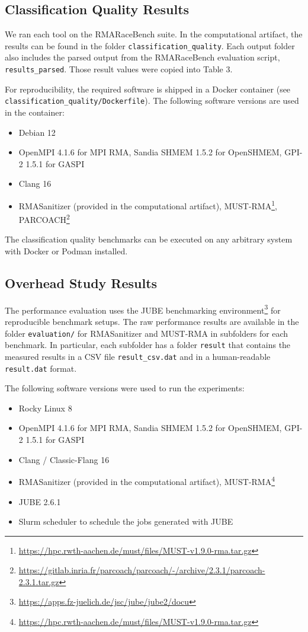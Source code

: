 \documentclass[twoside]{article}
\begin{document}
\subsection*{Classification Quality Results}
We ran each tool on the RMARaceBench suite. 
In the computational artifact, the results can be found in the folder \texttt{classification\_quality}.
Each output folder also includes the parsed output from the RMARaceBench evaluation script, \texttt{results\_parsed}.
Those result values were copied into Table 3.

For reproducibility, the required software is shipped in a Docker container (see \texttt{classification\_quality/Dockerfile}). The following software versions are used in the container:
\begin{itemize}
\item Debian 12
\item OpenMPI 4.1.6 for MPI RMA, Sandia SHMEM 1.5.2 for OpenSHMEM, GPI-2 1.5.1 for GASPI
\item Clang 16
\item RMASanitizer (provided in the computational artifact), MUST-RMA\footnote{\url{https://hpc.rwth-aachen.de/must/files/MUST-v1.9.0-rma.tar.gz}}, PARCOACH\footnote{\url{https://gitlab.inria.fr/parcoach/parcoach/-/archive/2.3.1/parcoach-2.3.1.tar.gz}}
\end{itemize}

The classification quality benchmarks can be executed on any arbitrary system with Docker or Podman installed.


\subsection*{Overhead Study Results}
The performance evaluation uses the JUBE benchmarking environment\footnote{\url{https://apps.fz-juelich.de/jsc/jube/jube2/docu}} for reproducible benchmark setups.
The raw performance results are available in the folder \texttt{evaluation/} for RMASanitizer and MUST-RMA in subfolders for each benchmark. In particular, each subfolder has a folder  \texttt{result} that contains the measured results in a CSV file \texttt{result\_csv.dat} and in a human-readable \texttt{result.dat} format.

The following software versions were used to run the experiments:
\begin{itemize}
\item Rocky Linux 8
\item OpenMPI 4.1.6 for MPI RMA, Sandia SHMEM 1.5.2 for OpenSHMEM, GPI-2 1.5.1 for GASPI
\item Clang / Classic-Flang 16
\item RMASanitizer (provided in the computational artifact), MUST-RMA\footnote{\url{https://hpc.rwth-aachen.de/must/files/MUST-v1.9.0-rma.tar.gz}}
\item JUBE 2.6.1
\item Slurm scheduler to schedule the jobs generated with JUBE
\end{itemize}
\end{document}
